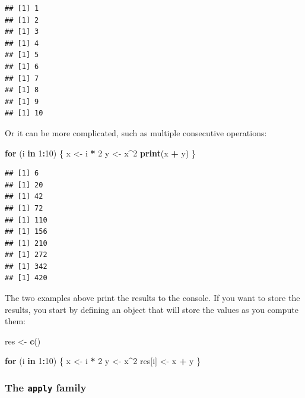\documentclass[
]{book}
\newenvironment{Shaded}{\begin{snugshade}}{\end{snugshade}}
\newcommand{\ControlFlowTok}[1]{\textcolor[rgb]{0.13,0.29,0.53}{\textbf{#1}}}
\newcommand{\DecValTok}[1]{\textcolor[rgb]{0.00,0.00,0.81}{#1}}
\newcommand{\FunctionTok}[1]{\textcolor[rgb]{0.13,0.29,0.53}{\textbf{#1}}}
\newcommand{\NormalTok}[1]{#1}
\newcommand{\OtherTok}[1]{\textcolor[rgb]{0.56,0.35,0.01}{#1}}
\newcommand{\SpecialCharTok}[1]{\textcolor[rgb]{0.81,0.36,0.00}{\textbf{#1}}}
\begin{document}
\begin{verbatim}
## [1] 1
## [1] 2
## [1] 3
## [1] 4
## [1] 5
## [1] 6
## [1] 7
## [1] 8
## [1] 9
## [1] 10
\end{verbatim}

Or it can be more complicated, such as multiple consecutive operations:

\begin{Shaded}
\begin{Highlighting}[]
\ControlFlowTok{for}\NormalTok{ (i }\ControlFlowTok{in} \DecValTok{1}\SpecialCharTok{:}\DecValTok{10}\NormalTok{) \{}
\NormalTok{  x }\OtherTok{\textless{}{-}}\NormalTok{ i }\SpecialCharTok{*} \DecValTok{2}
\NormalTok{  y }\OtherTok{\textless{}{-}}\NormalTok{ x}\SpecialCharTok{\^{}}\DecValTok{2}
  \FunctionTok{print}\NormalTok{(x }\SpecialCharTok{+}\NormalTok{ y)}
\NormalTok{\}}
\end{Highlighting}
\end{Shaded}

\begin{verbatim}
## [1] 6
## [1] 20
## [1] 42
## [1] 72
## [1] 110
## [1] 156
## [1] 210
## [1] 272
## [1] 342
## [1] 420
\end{verbatim}

The two examples above print the results to the console. If you want to store
the results, you start by defining an object that will store the values as you
compute them:

\begin{Shaded}
\begin{Highlighting}[]
\NormalTok{res }\OtherTok{\textless{}{-}} \FunctionTok{c}\NormalTok{()}

\ControlFlowTok{for}\NormalTok{ (i }\ControlFlowTok{in} \DecValTok{1}\SpecialCharTok{:}\DecValTok{10}\NormalTok{) \{}
\NormalTok{  x }\OtherTok{\textless{}{-}}\NormalTok{ i }\SpecialCharTok{*} \DecValTok{2}
\NormalTok{  y }\OtherTok{\textless{}{-}}\NormalTok{ x}\SpecialCharTok{\^{}}\DecValTok{2}
\NormalTok{  res[i] }\OtherTok{\textless{}{-}}\NormalTok{ x }\SpecialCharTok{+}\NormalTok{ y}
\NormalTok{\}}
\end{Highlighting}
\end{Shaded}

\hypertarget{the-apply-family}{%
\subsubsection{\texorpdfstring{The \texttt{apply} family}{The apply family}}\label{the-apply-family}}
\end{document}
